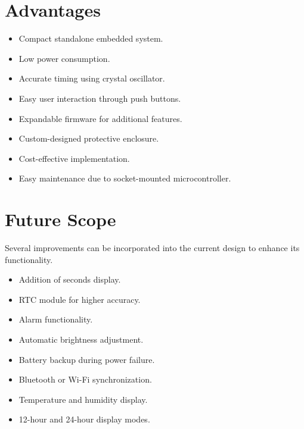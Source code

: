 \documentclass[12pt,a4paper]{article}
\begin{document}

\section{Advantages}

\begin{itemize}

\item Compact standalone embedded system.

\item Low power consumption.

\item Accurate timing using crystal oscillator.

\item Easy user interaction through push buttons.

\item Expandable firmware for additional features.

\item Custom-designed protective enclosure.

\item Cost-effective implementation.

\item Easy maintenance due to socket-mounted microcontroller.

\end{itemize}


\section{Future Scope}

Several improvements can be incorporated into the current design to enhance its functionality.

\begin{itemize}

\item Addition of seconds display.

\item RTC module for higher accuracy.

\item Alarm functionality.

\item Automatic brightness adjustment.

\item Battery backup during power failure.

\item Bluetooth or Wi-Fi synchronization.

\item Temperature and humidity display.

\item 12-hour and 24-hour display modes.

\end{itemize}
\end{document}
